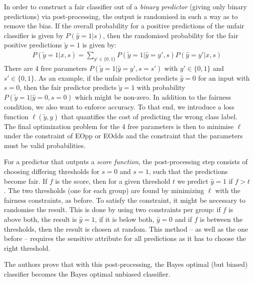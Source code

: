 In order to construct a fair classifier out of a \emph{binary predictor}
(giving only binary predictions) via post-processing,
the output is randomised in such a way as to remove the bias.
If the overall probability for a positive predictions of the unfair classifier is given by \(P(\hat{y}=1|s)\),
then the randomised probability for the fair positive predictions \(\tilde{y} = 1\) is given by:
\begin{align}
  \label{eq:hardt}
  P(\tilde{y}=1| x, s) = \sum\limits_{y' \in \{0, 1\}} P(\tilde{y} = 1| \hat{y}=y', s) 
  P(\hat{y}=y'| x, s)
\end{align}
There are 4 free parameters \(P(\tilde{y} = 1| \hat{y}=y', s=s')\) with \(y' \in \{0, 1\}\) and \(s' \in \{0, 1\}\).
As an example, if the unfair predictor predicts \(\hat{y} =0\) for an input with \(s=0\),
then the fair predictor predicts \(\tilde{y} =1\) with probability \(P(\tilde{y} = 1| \hat{y}=0, s=0)\)
which might be non-zero.
In addition to the fairness condition, we also want to enforce accuracy.
To that end, we introduce a loss function \(\ell (\tilde{y}, y)\)
that quantifies the cost of predicting the wrong class label.
The final optimization problem for the 4 free parameters is then to minimise \(\ell\)
under the constraint of \ac{EOpp} or \ac{EOdds}
and the constraint that the parameters must be valid probabilities.

For a predictor that outputs a \emph{score function},
the post-processing step consists of choosing differing thresholds for \(s=0\) and \(s=1\),
such that the predictions become fair.
If \(f\) is the score, then for a given threshold \(t\) we predict \(\hat{y} = 1\) if \(f > t\).
The two thresholds (one for each group) are found by minimizing \(\ell\) with the fairness constraints, as before.
To satisfy the constraint, it might be necessary to randomise the result.
This is done by using two constraints per group:
if \(f\) is above both, the result is \(\hat{y} = 1\), if it is below both, \(\hat{y} =0\)
and if \(f\) is between the thresholds, then the result is chosen at random.
This method -- as well as the one before --
requires the sensitive attribute for all predictions as it has to choose the right threshold.

The authors prove that with this post-processing,
the Bayes optimal (but biased) classifier becomes the Bayes optimal unbiased classifier.



